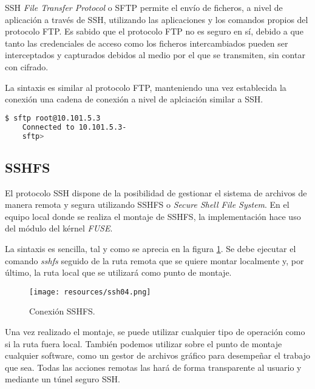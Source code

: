\documentclass[a4paper, 11pt, titlepage]{article}
\begin{document}
        SSH \textit{File Transfer Protocol} o SFTP permite el envío de ficheros, a nivel de aplicación a través 
        de SSH, utilizando las aplicaciones y los comandos propios del protocolo FTP. Es sabido que el protocolo 
        FTP no es seguro en sí, debido a que tanto las credenciales de acceso como los ficheros intercambiados 
        pueden ser interceptados y capturados debidos al medio por el que se transmiten, sin contar con cifrado.

        La sintaxis es similar al protocolo FTP, manteniendo una vez establecida la conexión una cadena de conexión 
        a nivel de aplciación similar a SSH.

        \begin{lstlisting}[language=bash,basicstyle=\footnotesize]
    $ sftp root@10.101.5.3
    Connected to 10.101.5.3-
    sftp> \end{lstlisting}
        
    \subsection{SSHFS}

        El protocolo SSH dispone de la posibilidad de gestionar el sistema de archivos de manera remota y segura 
        utilizando SSHFS o \textit{Secure Shell File System}. En el equipo local donde se realiza el montaje de 
        SSHFS, la implementación hace uso del módulo del kérnel \textit{FUSE}.

        La sintaxis es sencilla, tal y como se aprecia en la figura \ref{ssh04}. Se debe ejecutar el comando 
        \textit{sshfs} seguido de la ruta remota que se quiere montar localmente y, por último, la ruta local que 
        se utilizará como punto de montaje.

        \begin{figure}[htp]
            \centering
            \texttt{[image: resources/ssh04.png]}
            \caption{Conexión SSHFS.}
            \label{ssh04}
        \end{figure}

        Una vez realizado el montaje, se puede utilizar cualquier tipo de operación como si la ruta fuera local.
        También podemos utilizar sobre el punto de montaje cualquier software, como un gestor de archivos gráfico
        para desempeñar el trabajo que sea. Todas las acciones remotas las hará de forma transparente al usuario 
        y mediante un túnel seguro SSH.
\end{document}
